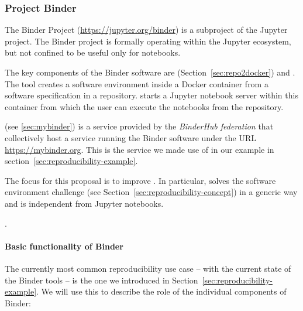 \subsubsection{Project Binder}\label{seq:project-binder}

The Binder Project \cite{binder} (\url{https://jupyter.org/binder}) is
a subproject of the Jupyter project. The Binder project is formally operating
within the Jupyter ecosystem, but not confined to be useful only for notebooks.

The key components of the Binder software are \repotodocker{}
(Section~\ref{sec:repo2docker}) and \binderhub{}. The \repotodocker{} tool
creates a software environment inside a Docker container from a software
specification in a repository. \binderhub{} starts a Jupyter notebook server
within this container from which the user can execute the notebooks from the
repository.

\emph{\mybinder{}} (see \ref{sec:mybinder}) is a service provided by the \emph{BinderHub
  federation} that collectively host a service running the Binder software
under the URL \url{https://mybinder.org}. This is the service we made use of in
our example in section~\ref{sec:reproducibility-example}.

The focus for this proposal is to improve \repotodocker{}. In particular,
\repotodocker{} solves the software environment challenge (see
Section~\ref{sec:reproducibility-concept}) in a generic way and is independent
from Jupyter notebooks.

.

\paragraph{Basic functionality of Binder}
\label{binder-how-does-it-work}

The currently most common reproducibility use case -- with the current state of the Binder
tools -- is the one we introduced in
Section~\ref{sec:reproducibility-example}. We will use this to
describe the role of the individual components of Binder:


